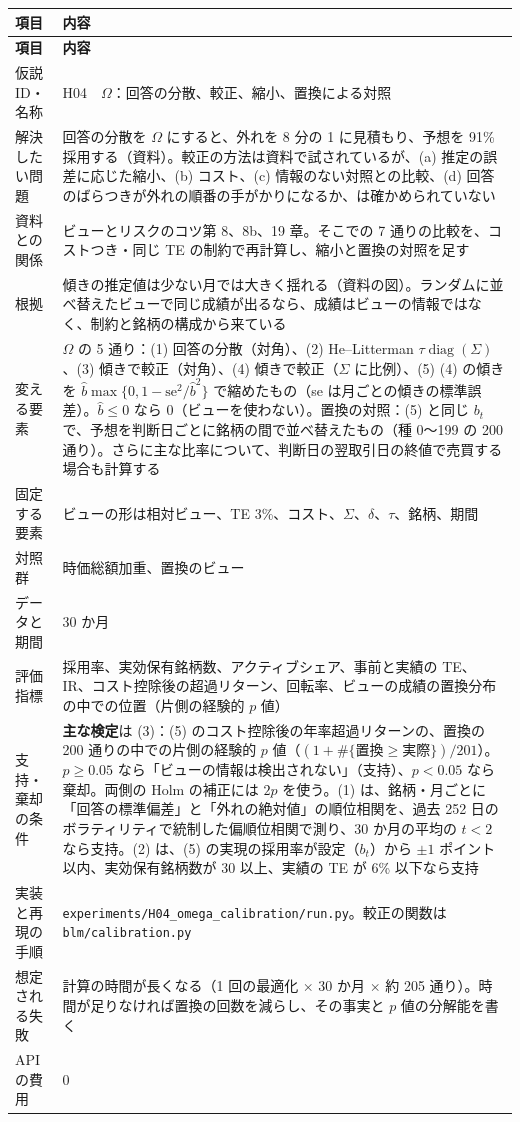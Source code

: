 \documentclass[xelatex,ja=standard,jafont=haranoaji,a4paper,10pt,openany]{bxjsreport}
\newcommand{\code}[1]{\texttt{#1}}
\DeclareMathOperator{\diag}{diag}
\newenvironment{plan}{\small\begin{longtable}{p{3.3cm}p{11.6cm}}\toprule\textbf{項目} & \textbf{内容} \\\midrule\endfirsthead
\toprule\textbf{項目} & \textbf{内容} \\\midrule\endhead\bottomrule\endfoot}{\end{longtable}}
\begin{document}
\begin{plan}
仮説 ID・名称 & H04　$\Omega$：回答の分散、較正、縮小、置換による対照 \\
解決したい問題 & 回答の分散を $\Omega$ にすると、外れを 8 分の 1 に見積もり、予想を 91\% 採用する（資料）。較正の方法は資料で試されているが、(a) 推定の誤差に応じた縮小、(b) コスト、(c) 情報のない対照との比較、(d) 回答のばらつきが外れの順番の手がかりになるか、は確かめられていない \\
資料との関係 & ビューとリスクのコツ第 8、8b、19 章。そこでの 7 通りの比較を、コストつき・同じ TE の制約で再計算し、縮小と置換の対照を足す \\
根拠 & 傾きの推定値は少ない月では大きく揺れる（資料の図）。ランダムに並べ替えたビューで同じ成績が出るなら、成績はビューの情報ではなく、制約と銘柄の構成から来ている \\
変える要素 & $\Omega$ の 5 通り：(1) 回答の分散（対角）、(2) He--Litterman $\tau\diag(\Sigma)$、(3) 傾きで較正（対角）、(4) 傾きで較正（$\Sigma$ に比例）、(5) (4) の傾きを $\hat b\max\{0,1-\mathrm{se}^2/\hat b^2\}$ で縮めたもの（se は月ごとの傾きの標準誤差）。$\hat b\le0$ なら 0（ビューを使わない）。置換の対照：(5) と同じ $b_t$ で、予想を判断日ごとに銘柄の間で並べ替えたもの（種 0〜199 の 200 通り）。さらに主な比率について、判断日の翌取引日の終値で売買する場合も計算する \\
固定する要素 & ビューの形は相対ビュー、TE 3\%、コスト、$\Sigma$、$\delta$、$\tau$、銘柄、期間 \\
対照群 & 時価総額加重、置換のビュー \\
データと期間 & 30 か月 \\
評価指標 & 採用率、実効保有銘柄数、アクティブシェア、事前と実績の TE、IR、コスト控除後の超過リターン、回転率、ビューの成績の置換分布の中での位置（片側の経験的 $p$ 値） \\
支持・棄却の条件 & \textbf{主な検定}は (3)：(5) のコスト控除後の年率超過リターンの、置換の 200 通りの中での片側の経験的 $p$ 値（$(1+\#\{\text{置換}\ge\text{実際}\})/201$）。$p\ge0.05$ なら「ビューの情報は検出されない」（支持）、$p<0.05$ なら棄却。両側の Holm の補正には $2p$ を使う。(1) は、銘柄・月ごとに「回答の標準偏差」と「外れの絶対値」の順位相関を、過去 252 日のボラティリティで統制した偏順位相関で測り、30 か月の平均の $t<2$ なら支持。(2) は、(5) の実現の採用率が設定（$b_t$）から $\pm1$ ポイント以内、実効保有銘柄数が 30 以上、実績の TE が 6\% 以下なら支持 \\
実装と再現の手順 & \code{experiments/H04\_omega\_calibration/run.py}。較正の関数は \code{blm/calibration.py} \\
想定される失敗 & 計算の時間が長くなる（1 回の最適化 $\times$ 30 か月 $\times$ 約 205 通り）。時間が足りなければ置換の回数を減らし、その事実と $p$ 値の分解能を書く \\
API の費用 & 0 \\
\end{plan}
\end{document}
